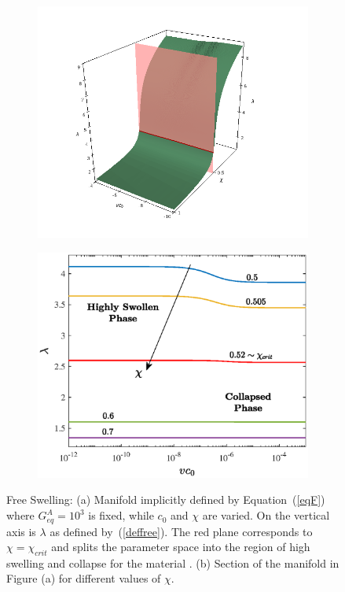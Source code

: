 \documentclass[runningheads]{llncs}
\begin{document}
\begin{figure}[h!]
	\begin{subfigure}{0.53\textwidth}
		\includegraphics[scale=0.25]{images/manifold}
		\caption{}
	\end{subfigure}
	\hspace{-5mm}
	\begin{subfigure}{0.46\textwidth}
		\hspace{-3mm}
		\includegraphics[scale=0.4]{images/free1}
		\caption{}
	\end{subfigure}
	\caption{Free Swelling: (a) Manifold implicitly defined by Equation~(\ref{eqF}) where $G^A_{eq}=10^3$ is fixed, while $c_0$ and $\chi$ are varied. On the vertical axis is $\lambda$ as defined by~(\ref{deffree}). The red plane corresponds to $\chi=\chi_{crit}$ and splits the parameter space into the region of high swelling and collapse for the material \cite{swell2}. (b) Section of the manifold in Figure (a) for different values of $\chi$.}
	\label{analysis}
\end{figure}
\end{document}
